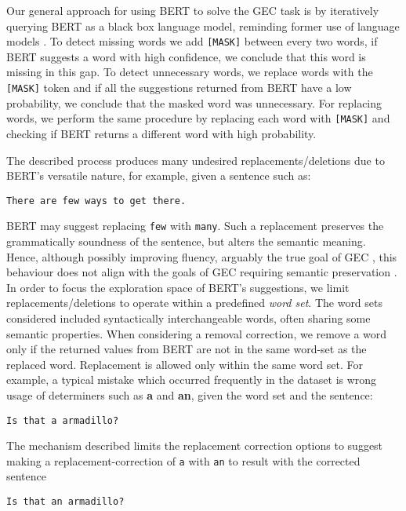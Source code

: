 \documentclass[11pt,a4paper]{article}
\begin{document}
Our general approach for using BERT to solve the GEC task is by iteratively querying BERT as a black box language model, reminding former use of language models \cite{dahlmeier2012beam,bryant-briscoe-2018-language}.
To detect missing words we add \verb|[MASK]| between every two words, if BERT suggests a word with high confidence, we conclude that this word is missing in this gap. To detect unnecessary words, we replace words with the \verb|[MASK]| token and if all the suggestions returned from BERT have a low probability, we conclude that the masked word was unnecessary. For replacing words, we perform the same procedure by replacing each word with \verb|[MASK]| and checking if BERT returns a different word with high probability.

The described process produces many undesired replacements/deletions due to BERT's versatile nature, for example, given a sentence such as:
\begin{center}
    \verb|There are few ways to get there.|
\end{center}
BERT may suggest replacing \verb|few| with \verb|many|. Such a replacement preserves the grammatically soundness of the sentence, but alters the semantic meaning. Hence, although possibly improving fluency, arguably the true goal of GEC \cite{napoles2017jfleg}, this behaviour does not align with the goals of GEC requiring semantic preservation \cite{choshen2018reference}. In order to focus the exploration space of BERT's suggestions, we limit replacements/deletions to operate within a predefined \textit{word set}. The word sets considered included syntactically interchangeable words, often sharing some semantic properties. When considering a removal correction, we remove a word only if the returned values from BERT are not in the same word-set as the replaced word. Replacement is allowed only within the same word set.
For example, a typical mistake which occurred frequently in the dataset is wrong usage of determiners such as \textbf{a} and \textbf{an}, given the word set  and the sentence:
\begin{center}
    \verb|Is that a armadillo?|
\end{center}
The mechanism described limits the replacement correction options to suggest making a replacement-correction of \verb|a| with \verb|an| to result with the corrected sentence
\begin{center}
    \verb|Is that an armadillo?|
\end{center}
\end{document}
